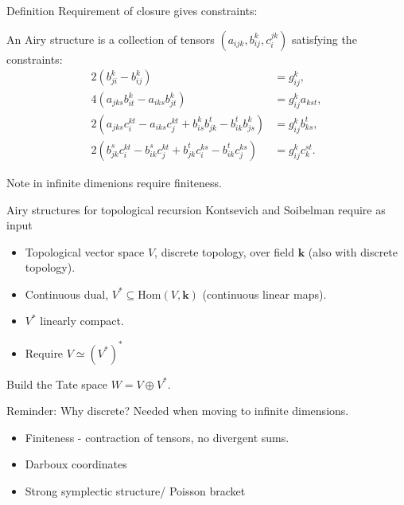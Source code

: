     \begin{frame}{Definition} 
    Requirement of closure gives constraints:
    \begin{defn} An Airy structure is a collection of tensors \( (a_{ijk},b_{ij}^k,c_i^{jk})\) satisfying the constraints:
    \begin{align*}
       2 \left(  b_{ji}^k - b_{ij}^k \right) &= g_{ij}^k,\\
       4\left( a_{jks} b_{it}^k -  a_{iks} b_{jt}^k \right) &=  g_{ij}^k  a_{kst}, \\
       2\left(  a_{jks} c_i^{k t} -  a_{ik s} c_j^{k t} +  b_{is}^k b_{jk}^t  -  b_{ik}^t b_{js}^k \right) & =  g_{ij}^k b_{ ks}^t, \\ 
       2 \left( b_{jk}^s c_i^{kt}  - b_{ik}^s c_j^{kt}+b_{jk}^t c_i^{ks}  - b_{ik}^t c_j^{ks}\right) &= g_{ij}^k c_k^{st}.
    \end{align*}
    \end{defn} 
    
    \end{frame}

    \begin{frame}
    Note in infinite dimenions require finiteness.
    \end{frame}

    \begin{frame}{Airy structures for topological recursion}
        Kontsevich and Soibelman require as input
        \begin{itemize}
            \item  Topological vector space \(V\), discrete topology, over field \(\mathbf{k}\) (also with discrete topology).
            \item Continuous dual, \(V^* \subseteq \text{Hom}(V, \mathbf{k}) \) (continuous linear maps).
            \item \(V^*\) linearly compact.
            \item Require \(V \simeq (V^*)^*\)
        \end{itemize}
        Build the Tate space \(W = V \oplus V^*\).
    \end{frame}

    \begin{frame}{Reminder: Why discrete?}
    Needed when moving to infinite dimensions.
        \begin{itemize}
            \item Finiteness - contraction of tensors, no divergent sums.
            \item Darboux coordinates
            \item Strong symplectic structure/ Poisson bracket
        \end{itemize}
    
    \end{frame}



